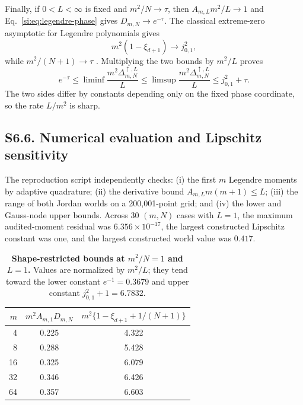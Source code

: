 Finally, if $0<L<\infty$ is fixed and $m^2/N\to\tau$, then $A_{m,L}m^2/L\to1$ and Eq.~\ref{si:eq:legendre-phase} gives $D_{m,N}\to e^{-\tau}$. The classical extreme-zero asymptotic for Legendre polynomials gives
\begin{equation}
m^2(1-\xi_{d+1})\longrightarrow j_{0,1}^2,
\label{si:eq:gauss-bessel}
\end{equation}
while $m^2/(N+1)\to\tau$ \citep{szego1939}. Multiplying the two bounds by $m^2/L$ proves
\begin{equation}
e^{-\tau}\le\liminf\frac{m^2\Delta^{\uparrow,L}_{m,N}}L
\le\limsup\frac{m^2\Delta^{\uparrow,L}_{m,N}}L
\le j_{0,1}^2+\tau.
\label{si:eq:regular-phase}
\end{equation}
The two sides differ by constants depending only on the fixed phase coordinate, so the rate $L/m^2$ is sharp.

\subsection*{S6.6. Numerical evaluation and Lipschitz sensitivity}

The reproduction script independently checks: (i) the first $m$ Legendre moments by adaptive quadrature; (ii) the derivative bound $A_{m,L}m(m+1)\le L$; (iii) the range of both Jordan worlds on a 200,001-point grid; and (iv) the lower and Gauss-node upper bounds. Across 30 $(m,N)$ cases with $L=1$, the maximum audited-moment residual was $6.356\times10^{-17}$, the largest constructed Lipschitz constant was one, and the largest constructed world value was $0.417$.

\begin{table}[h]
\centering
\caption{\textbf{Shape-restricted bounds at $m^2/N=1$ and $L=1$.} Values are normalized by $m^2/L$; they tend toward the lower constant $e^{-1}=0.3679$ and upper constant $j_{0,1}^2+1=6.7832$.}
\label{si:tab:regular-bounds}
\begin{tabular}{rcc}
\toprule
$m$ & $m^2A_{m,1}D_{m,N}$ & $m^2\{1-\xi_{d+1}+1/(N+1)\}$ \\
\midrule
4  & 0.225 & 4.322 \\
8  & 0.288 & 5.428 \\
16 & 0.325 & 6.079 \\
32 & 0.346 & 6.426 \\
64 & 0.357 & 6.603 \\
\bottomrule
\end{tabular}
\end{table}

